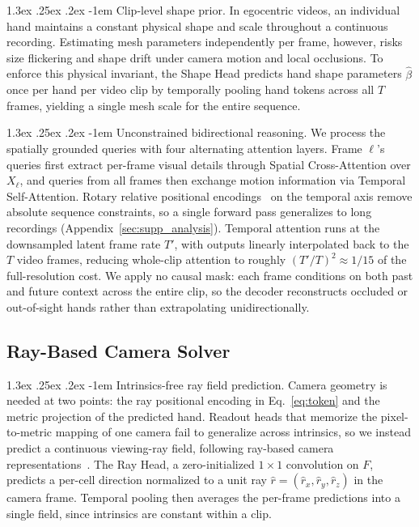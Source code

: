 \documentclass[10pt,twocolumn,letterpaper]{article}
\makeatletter
\renewcommand\paragraph{\@startsection{paragraph}{4}{\z@}%
  {1.3ex \@plus .25ex \@minus .2ex}%
  {-1em}%
  {\normalfont\normalsize\bfseries}}
\makeatother
\begin{document}
\paragraph{Clip-level shape prior.}
In egocentric videos, an individual hand maintains a constant physical shape and scale throughout a continuous recording. Estimating mesh parameters independently per frame, however, risks size flickering and shape drift under camera motion and local occlusions. To enforce this physical invariant, the Shape Head predicts hand shape parameters $\hat\beta$ once per hand per video clip by temporally pooling hand tokens across all $T$ frames, yielding a single mesh scale for the entire sequence.

\paragraph{Unconstrained bidirectional reasoning.}
We process the spatially grounded queries with four alternating attention layers. Frame $\ell$'s queries first extract per-frame visual details through Spatial Cross-Attention over $X_\ell$, and queries from all frames then exchange motion information via Temporal Self-Attention. Rotary relative positional encodings~\citep{rope2024} on the temporal axis remove absolute sequence constraints, so a single forward pass generalizes to long recordings (Appendix~\ref{sec:supp_analysis}). Temporal attention runs at the downsampled latent frame rate $T'$, with outputs linearly interpolated back to the $T$ video frames, reducing whole-clip attention to roughly $(T'/T)^2 \approx 1/15$ of the full-resolution cost. We apply no causal mask: each frame conditions on both past and future context across the entire clip, so the decoder reconstructs occluded or out-of-sight hands rather than extrapolating unidirectionally.

\subsection{Ray-Based Camera Solver}
\label{sec:camera}
\paragraph{Intrinsics-free ray field prediction.}
Camera geometry is needed at two points: the ray positional encoding in Eq.~\eqref{eq:token} and the metric projection of the predicted hand. Readout heads that memorize the pixel-to-metric mapping of one camera fail to generalize across intrinsics, so we instead predict a continuous viewing-ray field, following ray-based camera representations~\citep{raydiffusion2024,perspectivefields2023}. The Ray Head, a zero-initialized $1\times 1$ convolution on $F$, predicts a per-cell direction normalized to a unit ray $\hat r = (\hat r_x, \hat r_y, \hat r_z)$ in the camera frame. Temporal pooling then averages the per-frame predictions into a single field, since intrinsics are constant within a clip.
\end{document}

